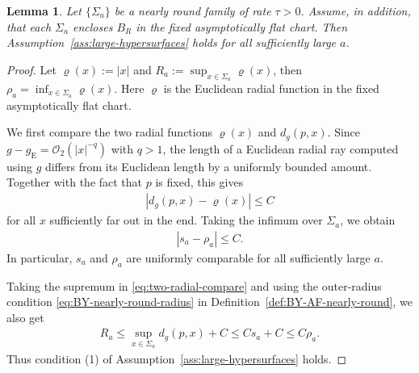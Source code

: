 \documentclass[10pt]{amsart}
\newcommand{\gE}{g_{\mathrm{E}}}
\theoremstyle{plain}
\newtheorem{lemma}[theorem]{Lemma}
\theoremstyle{remark}
\begin{document}
	\begin{lemma}\label{lem:BY-nearly-round-geometric-consequences}
		Let $\{\Sigma_a\}$ be a nearly round family of rate $\tau>0$.
		Assume, in addition, that each $\Sigma_a$ encloses $B_R$ in the
		fixed asymptotically flat chart. Then Assumption~\ref{ass:large-hypersurfaces} holds for
		all sufficiently large $a$.
	\end{lemma}
	
	\begin{proof}
		Let $\varrho(x):=|x|$ and $R_a:=\sup_{x\in\Sigma_a}\varrho(x)$, then $\rho_a=\inf_{x\in\Sigma_a}\varrho(x)$. Here $\varrho$ is the Euclidean radial function in the fixed
		asymptotically flat chart.
		
		We first compare the two radial functions $\varrho(x)$ and $d_g(p,x)$. Since
		$g-\gE=\mathcal O_2(|x|^{-q})$ with $q>1$, the length of a Euclidean radial
		ray computed using $g$ differs from its Euclidean length by a
		uniformly bounded amount. Together with the fact that $p$ is fixed,
		this gives
		\begin{align}\label{eq:two-radial-compare}
			\left|
			d_g(p,x)-\varrho(x)
			\right|
			\leq
			C
		\end{align}
		for all $x$ sufficiently far out in the end. Taking the infimum over
		$\Sigma_a$, we obtain
		\begin{align}\label{eq:BY-nearly-round-scale-comparison}
			|s_a-\rho_a|
			\leq
			C.
		\end{align}
		In particular, $s_a$ and $\rho_a$ are uniformly comparable for all sufficiently
		large $a$.
		
		Taking the supremum in \eqref{eq:two-radial-compare} and using the outer-radius condition \eqref{eq:BY-nearly-round-radius} in Definition~\ref{def:BY-AF-nearly-round}, we also get
		\begin{align*}
			R_a
			\leq
			\sup_{x\in\Sigma_a}d_g(p,x)+C
			\leq
			Cs_a+C
			\leq
			C\rho_a.
		\end{align*}
		Thus condition \textup{(1)} of
		Assumption~\ref{ass:large-hypersurfaces} holds.
		

\end{proof}
\end{document}
